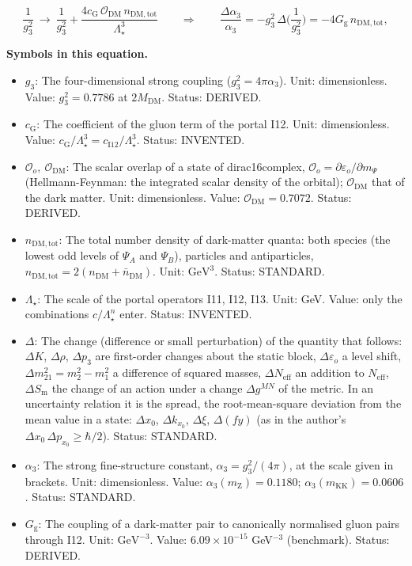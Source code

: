 \documentclass[
  10pt,
]{article}
\providecommand{\tightlist}{%
  \setlength{\itemsep}{0pt}\setlength{\parskip}{0pt}}
\begin{document}
\[
\frac{1}{g_3^2}\ \to\ \frac{1}{g_3^2} + \frac{4c_{\mathrm{G}}\,\mathcal{O}_{\mathrm{DM}}\,n_{\mathrm{DM,tot}}}{\Lambda_\star^3}\qquad\Rightarrow\qquad
\frac{\Delta\alpha_3}{\alpha_3} = -g_3^2\,\Delta\Big(\frac{1}{g_3^2}\Big) = -4G_{\mathrm{g}}\,n_{\mathrm{DM,tot}},
\]

\textbf{Symbols in this equation.}

\begin{itemize}
\tightlist
\item
  \(g_3\): The four-dimensional strong coupling
  (\(g_3^2 = 4\pi\alpha_3\)). Unit: dimensionless. Value:
  \(g_3^2 = 0.7786\) at \(2M_{\mathrm{DM}}\). Status: DERIVED.
\item
  \(c_{\mathrm{G}}\): The coefficient of the gluon term of the portal
  I12. Unit: dimensionless. Value:
  \(c_{\mathrm{G}}/\Lambda_\star^3 = c_{\mathrm{I12}}/\Lambda_\star^3\).
  Status: INVENTED.
\item
  \(\mathcal{O}_o,\ \mathcal{O}_{\mathrm{DM}}\): The scalar overlap of a
  state of dirac16complex,
  \(\mathcal{O}_o = \partial\varepsilon_o/\partial m_\Psi\)
  (Hellmann-Feynman: the integrated scalar density of the orbital);
  \(\mathcal{O}_{\mathrm{DM}}\) that of the dark matter. Unit:
  dimensionless. Value: \(\mathcal{O}_{\mathrm{DM}} = 0.7072\). Status:
  DERIVED.
\item
  \(n_{\mathrm{DM,tot}}\): The total number density of dark-matter
  quanta: both species (the lowest odd levels of \(\Psi_A\) and
  \(\Psi_B\)), particles and antiparticles,
  \(n_{\mathrm{DM,tot}} = 2(n_{\mathrm{DM}} + \bar n_{\mathrm{DM}})\).
  Unit: \(\mathrm{GeV}^{3}\). Status: STANDARD.
\item
  \(\Lambda_\star\): The scale of the portal operators I11, I12, I13.
  Unit: GeV. Value: only the combinations \(c/\Lambda_\star^n\) enter.
  Status: INVENTED.
\item
  \(\Delta\): The change (difference or small perturbation) of the
  quantity that follows: \(\Delta K\), \(\Delta\rho\), \(\Delta p_3\)
  are first-order changes about the static block,
  \(\Delta\varepsilon_o\) a level shift,
  \(\Delta m^2_{21} = m_2^2 - m_1^2\) a difference of squared masses,
  \(\Delta N_{\mathrm{eff}}\) an addition to \(N_{\mathrm{eff}}\),
  \(\Delta S_{\mathrm{m}}\) the change of an action under a change
  \(\Delta g^{MN}\) of the metric. In an uncertainty relation it is the
  spread, the root-mean-square deviation from the mean value in a state:
  \(\Delta x_0\), \(\Delta k_{x_0}\), \(\Delta\xi\), \(\Delta(fy)\) (as
  in the author's \(\Delta x_0\,\Delta p_{x_0} \ge \hbar/2\)). Status:
  STANDARD.
\item
  \(\alpha_3\): The strong fine-structure constant,
  \(\alpha_3 = g_3^2/(4\pi)\), at the scale given in brackets. Unit:
  dimensionless. Value: \(\alpha_3(m_{\mathrm{Z}}) = 0.1180\);
  \(\alpha_3(m_{\mathrm{KK}}) = 0.0606\). Status: STANDARD.
\item
  \(G_{\mathrm{g}}\): The coupling of a dark-matter pair to canonically
  normalised gluon pairs through I12. Unit: \(\mathrm{GeV}^{-3}\).
  Value: \(6.09\times10^{-15}\) GeV\(^{-3}\) (benchmark). Status:
  DERIVED.
\end{itemize}
\end{document}
